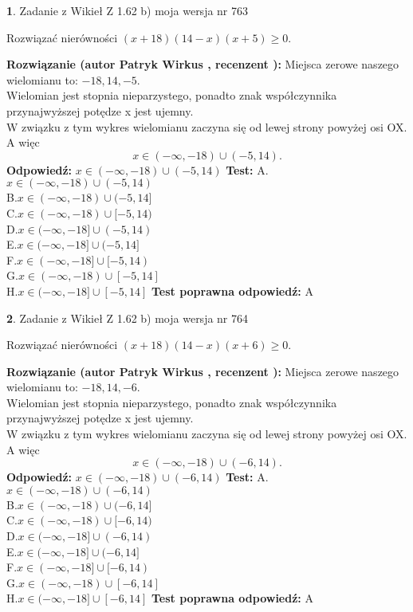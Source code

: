 \documentclass[12pt, a4paper]{article}
\theoremstyle{definition} %
\newtheorem{zad}{}
\newcommand{\zadStart}[1]{\begin{zad}#1\newline}
\newcommand{\zadStop}{\end{zad}}
\newcommand{\rozwStart}[2]{\noindent \textbf{Rozwiązanie (autor #1 , recenzent #2): }\newline}
\newcommand{\rozwStop}{\newline}
\newcommand{\odpStart}{\noindent \textbf{Odpowiedź:}\newline}
\newcommand{\odpStop}{\newline}
\newcommand{\testStart}{\noindent \textbf{Test:}\newline}
\newcommand{\testStop}{\newline}
\newcommand{\kluczStart}{\noindent \textbf{Test poprawna odpowiedź:}\newline}
\newcommand{\kluczStop}{\newline}
\begin{document}
\zadStart{Zadanie z Wikieł Z 1.62 b) moja wersja nr 763}

Rozwiązać nierówności $(x+18)(14-x)(x+5)\ge0$.
\zadStop
\rozwStart{Patryk Wirkus}{}
Miejsca zerowe naszego wielomianu to: $-18, 14, -5$.\\
Wielomian jest stopnia nieparzystego, ponadto znak współczynnika przy\linebreak najwyższej potędze x jest ujemny.\\ W związku z tym wykres wielomianu zaczyna się od lewej strony powyżej osi OX. A więc $$x \in (-\infty,-18) \cup (-5,14).$$
\rozwStop
\odpStart
$x \in (-\infty,-18) \cup (-5,14)$
\odpStop
\testStart
A.$x \in (-\infty,-18) \cup (-5,14)$\\
B.$x \in (-\infty,-18) \cup (-5,14]$\\
C.$x \in (-\infty,-18) \cup [-5,14)$\\
D.$x \in (-\infty,-18] \cup (-5,14)$\\
E.$x \in (-\infty,-18] \cup (-5,14]$\\
F.$x \in (-\infty,-18] \cup [-5,14)$\\
G.$x \in (-\infty,-18) \cup [-5,14]$\\
H.$x \in (-\infty,-18] \cup [-5,14]$
\testStop
\kluczStart
A
\kluczStop



\zadStart{Zadanie z Wikieł Z 1.62 b) moja wersja nr 764}

Rozwiązać nierówności $(x+18)(14-x)(x+6)\ge0$.
\zadStop
\rozwStart{Patryk Wirkus}{}
Miejsca zerowe naszego wielomianu to: $-18, 14, -6$.\\
Wielomian jest stopnia nieparzystego, ponadto znak współczynnika przy\linebreak najwyższej potędze x jest ujemny.\\ W związku z tym wykres wielomianu zaczyna się od lewej strony powyżej osi OX. A więc $$x \in (-\infty,-18) \cup (-6,14).$$
\rozwStop
\odpStart
$x \in (-\infty,-18) \cup (-6,14)$
\odpStop
\testStart
A.$x \in (-\infty,-18) \cup (-6,14)$\\
B.$x \in (-\infty,-18) \cup (-6,14]$\\
C.$x \in (-\infty,-18) \cup [-6,14)$\\
D.$x \in (-\infty,-18] \cup (-6,14)$\\
E.$x \in (-\infty,-18] \cup (-6,14]$\\
F.$x \in (-\infty,-18] \cup [-6,14)$\\
G.$x \in (-\infty,-18) \cup [-6,14]$\\
H.$x \in (-\infty,-18] \cup [-6,14]$
\testStop
\kluczStart
A
\kluczStop
\end{document}
